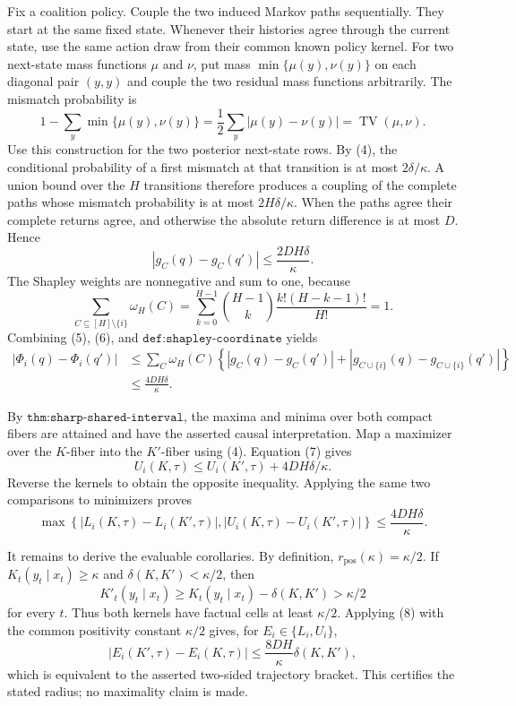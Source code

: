 Fix a coalition policy.  Couple the two induced Markov paths sequentially.  They start at the same fixed state.  Whenever their histories agree through the current state, use the same action draw from their common known policy kernel.  For two next-state mass functions \(\mu\) and \(\nu\), put mass \(\min\{\mu(y),\nu(y)\}\) on each diagonal pair \((y,y)\) and couple the two residual mass functions arbitrarily.  The mismatch probability is
\[
 1-\sum_y\min\{\mu(y),\nu(y)\}
 =\frac12\sum_y|\mu(y)-\nu(y)|
 =\operatorname{TV}(\mu,\nu).
\]
Use this construction for the two posterior next-state rows.  By (4), the conditional probability of a first mismatch at that transition is at most \(2\delta/\kappa\).  A union bound over the \(H\) transitions therefore produces a coupling of the complete paths whose mismatch probability is at most \(2H\delta/\kappa\).  When the paths agree their complete returns agree, and otherwise the absolute return difference is at most \(D\).  Hence
\[
 |g_C(q)-g_C(q')|\le\frac{2DH\delta}{\kappa}.
 \tag{5}
\]
The Shapley weights are nonnegative and sum to one, because
\[
 \sum_{C\subseteq[H]\setminus\{i\}}\omega_H(C)
 =\sum_{k=0}^{H-1}{H-1\choose k}
   \frac{k!(H-k-1)!}{H!}
 =1.
 \tag{6}
\]
Combining (5), (6), and \(\texttt{def:shapley-coordinate}\) yields
\[
\begin{aligned}
 |\Phi_i(q)-\Phi_i(q')|
 &\le\sum_C\omega_H(C)
 \left\{|g_C(q)-g_C(q')|
       +|g_{C\cup\{i\}}(q)-g_{C\cup\{i\}}(q')|\right\}\\
 &\le\frac{4DH\delta}{\kappa}.
\end{aligned}
\tag{7}
\]

By \(\texttt{thm:sharp-shared-interval}\), the maxima and minima over both compact fibers are attained and have the asserted causal interpretation.  Map a maximizer over the \(K\)-fiber into the \(K'\)-fiber using (4).  Equation (7) gives
\[
 U_i(K,\tau)\le U_i(K',\tau)+4DH\delta/\kappa.
\]
Reverse the kernels to obtain the opposite inequality.  Applying the same two comparisons to minimizers proves
\[
 \max\!\left\{|L_i(K,\tau)-L_i(K',\tau)|,
                 |U_i(K,\tau)-U_i(K',\tau)|\right\}
 \le\frac{4DH\delta}{\kappa}.
 \tag{8}
\]

It remains to derive the evaluable corollaries.  By definition, \(r_{\mathrm{pos}}(\kappa)=\kappa/2\).  If \(K_t(y_t\mid x_t)\ge\kappa\) and \(\delta(K,K')<\kappa/2\), then
\[
 K'_t(y_t\mid x_t)
 \ge K_t(y_t\mid x_t)-\delta(K,K')
 >\kappa/2
\]
for every \(t\).  Thus both kernels have factual cells at least \(\kappa/2\).  Applying (8) with the common positivity constant \(\kappa/2\) gives, for \(E_i\in\{L_i,U_i\}\),
\[
 |E_i(K',\tau)-E_i(K,\tau)|
 \le\frac{8DH}{\kappa}\delta(K,K'),
\]
which is equivalent to the asserted two-sided trajectory bracket.  This certifies the stated radius; no maximality claim is made.

